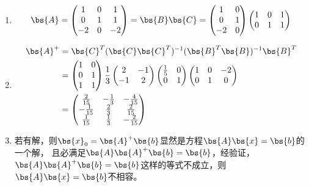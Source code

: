 \documentclass[12pt, a4paper, oneside]{ctexbook}
\begin{document}
\section{}
\begin{enumerate}
\item 
\begin{align*}
\bs{A}=\begin{pmatrix}
    1& 0 &1 \\
    0& 1 & 1\\
    -2 & 0& -2
\end{pmatrix}=\bs{B}\bs{C}=\begin{pmatrix}
    1& 0  \\
    0& 1 \\
    -2 & 0
\end{pmatrix}\begin{pmatrix}
    1& 0  &1\\
    0& 1 &1\\
\end{pmatrix}
\end{align*}

\item  
\begin{align*}
    \bs{A}^+&=\bs{C}^T(\bs{C}\bs{C}^T)^{-1}(\bs{B}^T\bs{B})^{-1}\bs{B}^T \\
    &=\begin{pmatrix}
        1& 0  \\
        0& 1 \\
        1 & 1
    \end{pmatrix}
    \frac{1}{3}
    \begin{pmatrix}
        2& -1  \\
        -1& 2 \\
    \end{pmatrix}
    \begin{pmatrix}
        \frac{1}{5}& 0  \\
        0& 1 \\
    \end{pmatrix}
    \begin{pmatrix}
        1& 0 &-2 \\
        0& 1 & 0\\
    \end{pmatrix}\\
    &=\begin{pmatrix}
        \frac{2}{15}& -\frac{1}{3} &-\frac{4}{15} \\
        -\frac{1}{15}& \frac{2}{3} & \frac{2}{15}\\
        \frac{1}{15} & \frac{1}{3}& -\frac{2}{15}
    \end{pmatrix}
\end{align*}
\item  若有解，则$\bs{x}_0=\bs{A}^+\bs{b}$显然是方程$\bs{A}\bs{x}=\bs{b}$的一个解，
且必满足$\bs{A}\bs{A}^+\bs{b}=\bs{b}$，经验证，
$\bs{A}\bs{A}^+\bs{b}=\bs{b}$这样的等式不成立，则$\bs{A}\bs{x}=\bs{b}$不相容。


\end{enumerate}
\end{document}
